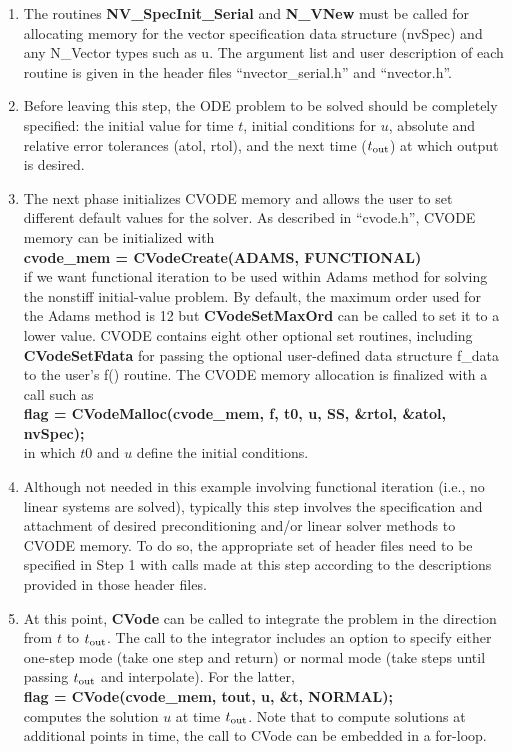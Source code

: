 \begin{enumerate}
\item The routines {\bf NV\_SpecInit\_Serial} and {\bf N\_VNew} must be called for
allocating memory for the vector specification data structure (nvSpec)
and any N\_Vector types such as u.  The argument list and user
description of each routine is given in the header files
``nvector\_serial.h'' and ``nvector.h''.

\item Before leaving this step, the ODE problem to be solved should be completely
specified: the initial value for time $t$, initial conditions for $u$,
absolute and relative error tolerances (atol, rtol), and the next time
($t_{\rm out}$) at which output is desired.

\item The next phase initializes CVODE memory and
allows the user to set different default values for the solver.
As described in ``cvode.h'', CVODE memory can be initialized with \\
{\bf cvode\_mem = CVodeCreate(ADAMS, FUNCTIONAL)}\\
if we want functional iteration to be used within Adams method for
solving the nonstiff initial-value problem.
By default, the maximum order used for the Adams method is 12 but 
{\bf CVodeSetMaxOrd} can be called to set it to a lower value.
CVODE contains eight other optional set routines, including
{\bf CVodeSetFdata} for passing the optional user-defined data
structure f\_data to the user's f() routine.
The CVODE memory allocation is finalized with a call such as \\
{\bf flag = CVodeMalloc(cvode\_mem, f, t0, u, SS, \&rtol, \&atol,
nvSpec);} \\
in which $t0$ and $u$ define the initial conditions.

\item Although not needed in this example involving functional
iteration (i.e., no linear systems are solved), typically this step
involves the specification and attachment of desired preconditioning
and/or linear solver methods to CVODE memory. To do so, the
appropriate set of header files need to be specified in Step 1 with
calls made at this step according to the descriptions provided in
those header files.

\item At this point, {\bf CVode} can be called to integrate the
problem in the direction from $t$ to $t_{\rm out}$. The call to the
integrator includes an option to specify either one-step mode (take
one step and return) or normal mode (take steps until passing 
$t_{\rm out}$ and interpolate).
For the latter, \\
{\bf flag = CVode(cvode\_mem, tout, u, \&t, NORMAL);} \\
computes the solution $u$ at time $t_{\rm out}$. Note that to compute
solutions at additional points in time, the call to CVode can be
embedded in a for-loop.


\end{enumerate}

